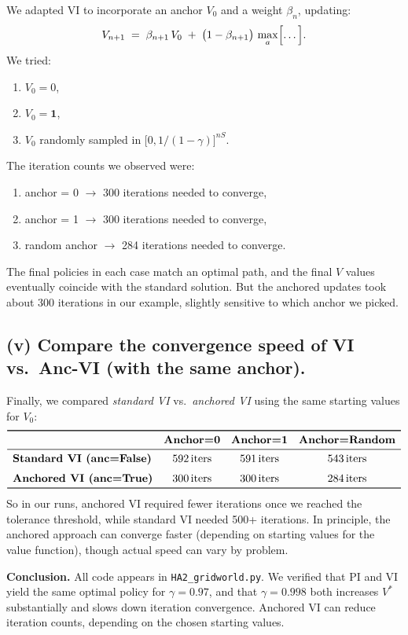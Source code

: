 \noindent
We adapted VI to incorporate an anchor $V_0$ and a weight $\beta_n$, updating:
\[
  V_{n+1}
  \;=\;\beta_{n+1}\,V_0 \;+\;\bigl(1-\beta_{n+1}\bigr)\,\max_{a}\Bigl[\dots\Bigr].
\]
We tried:
\begin{enumerate}[label=(\alph*)]
\item $V_0=0$,
\item $V_0= \mathbf{1}$,
\item $V_0$ randomly sampled in $\bigl[0,1/(1-\gamma)\bigr]^{nS}$.
\end{enumerate}
The iteration counts we observed were:
\begin{enumerate}[label=(\alph*)]
\item anchor = 0 $\rightarrow$ 300 iterations needed to converge,
\item anchor = 1 $\rightarrow$ 300 iterations needed to converge,
\item random anchor $\rightarrow$ 284 iterations needed to converge.
\end{enumerate}
The final policies in each case match an optimal path, 
and the final $V$ values eventually coincide with the standard solution. 
But the anchored updates took about 300 iterations in our example, 
slightly sensitive to which anchor we picked.

\subsection*{(v) Compare the convergence speed of VI vs.\ Anc-VI (with the same anchor).}

\noindent
Finally, we compared \emph{standard VI} vs.\ \emph{anchored VI} using the same starting values for $V_0$:
\[
  \begin{array}{lccc}
  \toprule
    & \multicolumn{1}{c}{\textbf{Anchor=0}} & 
      \multicolumn{1}{c}{\textbf{Anchor=1}} &
      \multicolumn{1}{c}{\textbf{Anchor=Random}} \\
  \midrule
    \textbf{Standard VI (anc=False)} 
       & 592\,\text{iters} & 591\,\text{iters} & 543\,\text{iters} \\[6pt]
    \textbf{Anchored VI (anc=True)} 
       & 300\,\text{iters} & 300\,\text{iters} & 284\,\text{iters} \\
  \bottomrule
  \end{array}
\]
So in our runs, anchored VI required fewer iterations once we reached 
the tolerance threshold, while standard VI needed 500+ iterations. 
In principle, the anchored approach can converge faster (depending on starting values for the value function), 
though actual speed can vary by problem.

\bigskip

\noindent
\textbf{Conclusion.} 
All code appears in \texttt{HA2\_gridworld.py}.  We verified that PI and VI 
yield the same optimal policy for $\gamma=0.97$, 
and that $\gamma=0.998$ both increases $V^*$ substantially 
and slows down iteration convergence.  Anchored VI can reduce iteration counts, 
depending on the chosen starting values.